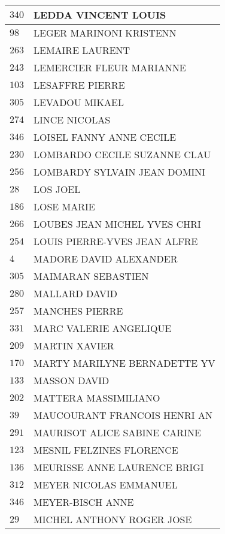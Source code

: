 \begin{xltabular}{\linewidth}{|l|X|}
    \hline
    $340$ & LEDDA VINCENT LOUIS \\
    \hline
    $98$ & LEGER MARINONI KRISTENN \\
    \hline
    $263$ & LEMAIRE LAURENT \\
    \hline
    $243$ & LEMERCIER FLEUR MARIANNE \\
    \hline
    $103$ & LESAFFRE PIERRE \\
    \hline
    $305$ & LEVADOU MIKAEL \\
    \hline
    $274$ & LINCE NICOLAS \\
    \hline
    $346$ & LOISEL FANNY ANNE CECILE \\
    \hline
    $230$ & LOMBARDO CECILE SUZANNE CLAU \\
    \hline
    $256$ & LOMBARDY SYLVAIN JEAN DOMINI \\
    \hline
    $28$ & LOS JOEL \\
    \hline
    $186$ & LOSE MARIE \\
    \hline
    $266$ & LOUBES JEAN MICHEL YVES CHRI \\
    \hline
    $254$ & LOUIS PIERRE-YVES JEAN ALFRE \\
    \hline
    $4$ & MADORE DAVID ALEXANDER \\
    \hline
    $305$ & MAIMARAN SEBASTIEN \\
    \hline
    $280$ & MALLARD DAVID \\
    \hline
    $257$ & MANCHES PIERRE \\
    \hline
    $331$ & MARC VALERIE ANGELIQUE \\
    \hline
    $209$ & MARTIN XAVIER \\
    \hline
    $170$ & MARTY MARILYNE BERNADETTE YV \\
    \hline
    $133$ & MASSON DAVID \\
    \hline
    $202$ & MATTERA MASSIMILIANO \\
    \hline
    $39$ & MAUCOURANT FRANCOIS HENRI AN \\
    \hline
    $291$ & MAURISOT ALICE SABINE CARINE \\
    \hline
    $123$ & MESNIL FELZINES FLORENCE \\
    \hline
    $136$ & MEURISSE ANNE LAURENCE BRIGI \\
    \hline
    $312$ & MEYER NICOLAS EMMANUEL \\
    \hline
    $346$ & MEYER-BISCH ANNE \\
    \hline
    $29$ & MICHEL ANTHONY ROGER JOSE \\

\end{xltabular}
